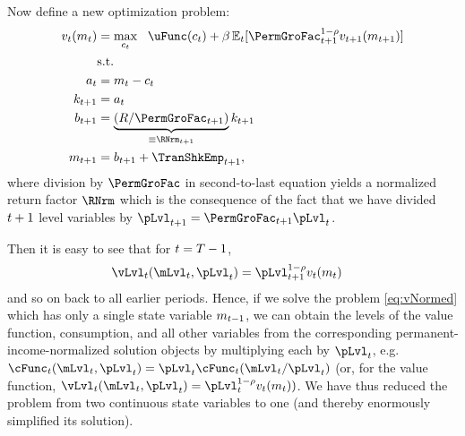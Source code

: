 Now define a new optimization problem:
  \begin{equation}\begin{gathered}\begin{aligned}
        \vFunc_{\prd}({\mNrm}_{\prd}) & = \max_{{\cNrm}_{\prd}} ~~ \uFunc({\cNrm}_{\prd})+{\DiscFac}\Ex_{\prd}[ \PermGroFac_{\prd+1}^{1-\CRRA}\vFunc_{\prd+1}({\mNrm}_{\prd+1})] \label{eq:vNormed}                   \\
                                         & \text{s.t.}                                                                                 \\
        {\aNrm}_{\prd}                       & = {\mNrm}_{\prd}-{\cNrm}_{\prd}                                                                     \\
        {\kNrm}_{\prd+1}                     & = {\aNrm}_{\prd}                                                                                \\
        {\bNrm}_{\prd+1}                     & = \underbrace{\left(\Rfree/\PermGroFac_{\prd+1}\right)}_{\equiv \RNrm_{\prd+1}}{\kNrm}_{\prd+1} \\
        {\mNrm}_{t+1}                        & = {\bNrm}_{t+1}+\TranShkEmp_{t+1},
      \end{aligned}\end{gathered}\end{equation}
where division by $\PermGroFac$ in second-to-last equation yields a normalized return factor $\RNrm$ which is the consequence of the fact that we have divided $t+1$ level variables by $\pLvl_{\prd+1}=\PermGroFac_{\prd+1}\pLvl_{\prd}$.

Then it is easy to see that for $t=T-1$, 
\begin{equation*}\begin{gathered}\begin{aligned}
      \vLvl_{\prd}(\mLvl_{\prd},\pLvl_{\prd}) & =  \pLvl_{\prd+1}^{1-\CRRA}\vFunc_{\prdt}({\mNrm}_{\prdt})
    \end{aligned}\end{gathered}\end{equation*}
and so on back to all earlier periods.  Hence, if we solve the problem \eqref{eq:vNormed} which has only a single state variable $m_{t-1}$, we can obtain the levels of the value function, consumption, and all other variables from the corresponding permanent-income-normalized solution objects by multiplying each by $\pLvl_{\prd}$, e.g.\ $\cFunc_{\prd}(\mLvl_{\prd},\pLvl_{\prd})=\pLvl_{\prd}\cFunc_{\prd}(\mLvl_{\prd}/\pLvl_{\prd})$ (or, for the value function, $\vLvl _{\prd}(\mLvl_{\prd},\pLvl_{\prd}) = \pLvl_{\prd}^{1-\CRRA}\vFunc_{\prd}({\mNrm}_{\prd}))$.  We have thus reduced the problem from two continuous state variables to one (and thereby enormously simplified its solution).

